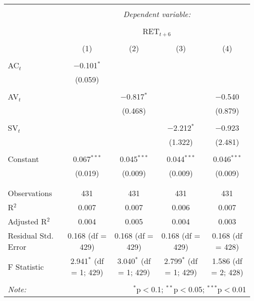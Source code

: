 
\begin{table}[!htbp] \centering 
  \caption{} 
  \label{} 
\begin{tabular}{@{\extracolsep{5pt}}lcccc} 
\\[-1.8ex]\hline 
\hline \\[-1.8ex] 
 & \multicolumn{4}{c}{\textit{Dependent variable:}} \\ 
\cline{2-5} 
\\[-1.8ex] & \multicolumn{4}{c}{RET$_{t+6}$} \\ 
\\[-1.8ex] & (1) & (2) & (3) & (4)\\ 
\hline \\[-1.8ex] 
 AC$_{t}$ & $-$0.101$^{*}$ &  &  &  \\ 
  & (0.059) &  &  &  \\ 
  & & & & \\ 
 AV$_{t}$ &  & $-$0.817$^{*}$ &  & $-$0.540 \\ 
  &  & (0.468) &  & (0.879) \\ 
  & & & & \\ 
 SV$_{t}$ &  &  & $-$2.212$^{*}$ & $-$0.923 \\ 
  &  &  & (1.322) & (2.481) \\ 
  & & & & \\ 
 Constant & 0.067$^{***}$ & 0.045$^{***}$ & 0.044$^{***}$ & 0.046$^{***}$ \\ 
  & (0.019) & (0.009) & (0.009) & (0.009) \\ 
  & & & & \\ 
\hline \\[-1.8ex] 
Observations & 431 & 431 & 431 & 431 \\ 
R$^{2}$ & 0.007 & 0.007 & 0.006 & 0.007 \\ 
Adjusted R$^{2}$ & 0.004 & 0.005 & 0.004 & 0.003 \\ 
Residual Std. Error & 0.168 (df = 429) & 0.168 (df = 429) & 0.168 (df = 429) & 0.168 (df = 428) \\ 
F Statistic & 2.941$^{*}$ (df = 1; 429) & 3.040$^{*}$ (df = 1; 429) & 2.799$^{*}$ (df = 1; 429) & 1.586 (df = 2; 428) \\ 
\hline 
\hline \\[-1.8ex] 
\textit{Note:}  & \multicolumn{4}{r}{$^{*}$p$<$0.1; $^{**}$p$<$0.05; $^{***}$p$<$0.01} \\ 
\end{tabular} 
\end{table} 
